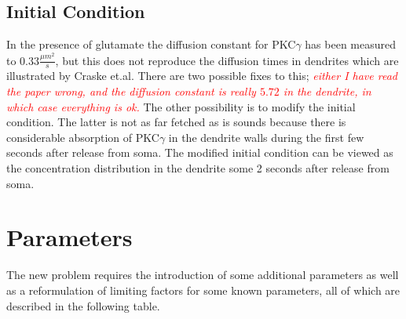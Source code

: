 \subsection{Initial Condition}

In the presence of glutamate the diffusion constant for PKC$\gamma$ has been measured to $0.33\frac{\mu m^2}{s}$, but this does not reproduce the diffusion times in dendrites which are illustrated by Craske et.al. 
There are two possible fixes to this; \emph{\textcolor{red}{either I have read the paper wrong, and the diffusion constant is really $5.72$ in the dendrite, in which case everything is ok.}} 
The other possibility is to modify the initial condition. The latter is not as far fetched as is sounds because there is considerable absorption of PKC$\gamma$ in the dendrite walls during the first few seconds after release from soma. 
The modified initial condition can be viewed as the concentration distribution in the dendrite some 2 seconds after release from soma.
\clearpage

\section{Parameters}

The new problem requires the introduction of some additional parameters as well as a reformulation of limiting factors for some known parameters, all of which are described in the following table.
 
